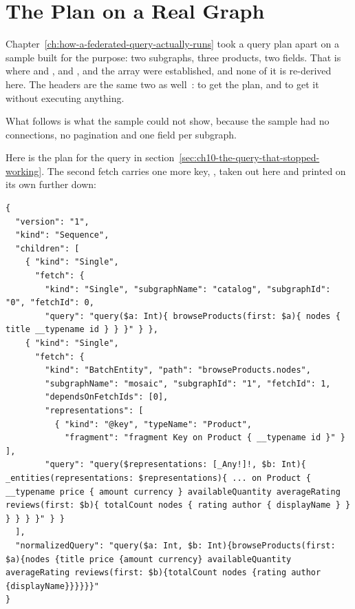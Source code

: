 \section{The Plan on a Real Graph}
\label{sec:ch10-the-plan-on-a-real-graph}
%

Chapter~\ref{ch:how-a-federated-query-actually-runs} took a query plan apart on
a sample built for the purpose: two subgraphs, three products, two fields. That
is where  and ,  and
,  and the  array
were established, and none of it is re-derived here. The headers are the same
two as well~\autocite{cosmo2026queryplan}:  to get
the plan, and  to get it without executing anything.

What follows is what the sample could not show, because the sample had no
connections, no pagination and one field per subgraph.

Here is the plan for the query in
section~\ref{sec:ch10-the-query-that-stopped-working}. The second fetch carries
one more key, , taken out here and printed on its own
further down:

\begin{verbatim}
{
  "version": "1",
  "kind": "Sequence",
  "children": [
    { "kind": "Single",
      "fetch": {
        "kind": "Single", "subgraphName": "catalog", "subgraphId": "0", "fetchId": 0,
        "query": "query($a: Int){ browseProducts(first: $a){ nodes { title __typename id } } }" } },
    { "kind": "Single",
      "fetch": {
        "kind": "BatchEntity", "path": "browseProducts.nodes",
        "subgraphName": "mosaic", "subgraphId": "1", "fetchId": 1,
        "dependsOnFetchIds": [0],
        "representations": [
          { "kind": "@key", "typeName": "Product",
            "fragment": "fragment Key on Product { __typename id }" } ],
        "query": "query($representations: [_Any!]!, $b: Int){ _entities(representations: $representations){ ... on Product { __typename price { amount currency } availableQuantity averageRating reviews(first: $b){ totalCount nodes { rating author { displayName } } } } } }" } }
  ],
  "normalizedQuery": "query($a: Int, $b: Int){browseProducts(first: $a){nodes {title price {amount currency} availableQuantity averageRating reviews(first: $b){totalCount nodes {rating author {displayName}}}}}}"
}
\end{verbatim}

